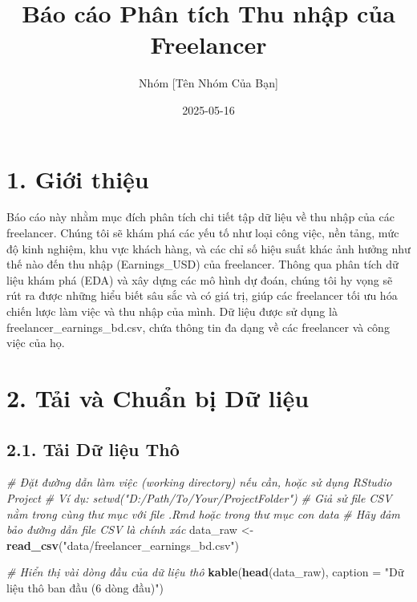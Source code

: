 \documentclass[
]{article}
\title{Báo cáo Phân tích Thu nhập của Freelancer}
\author{Nhóm {[}Tên Nhóm Của Bạn{]}}
\date{2025-05-16}
\newenvironment{Shaded}{\begin{snugshade}}{\end{snugshade}}
\newcommand{\AttributeTok}[1]{\textcolor[rgb]{0.13,0.29,0.53}{#1}}
\newcommand{\CommentTok}[1]{\textcolor[rgb]{0.56,0.35,0.01}{\textit{#1}}}
\newcommand{\FunctionTok}[1]{\textcolor[rgb]{0.13,0.29,0.53}{\textbf{#1}}}
\newcommand{\NormalTok}[1]{#1}
\newcommand{\OtherTok}[1]{\textcolor[rgb]{0.56,0.35,0.01}{#1}}
\newcommand{\StringTok}[1]{\textcolor[rgb]{0.31,0.60,0.02}{#1}}
\begin{document}
\maketitle

{
\setcounter{tocdepth}{2}
\tableofcontents
}
\section{1. Giới thiệu}\label{giux1edbi-thiux1ec7u}

Báo cáo này nhằm mục đích phân tích chi tiết tập dữ liệu về thu nhập của
các freelancer. Chúng tôi sẽ khám phá các yếu tố như loại công việc, nền
tảng, mức độ kinh nghiệm, khu vực khách hàng, và các chỉ số hiệu suất
khác ảnh hưởng như thế nào đến thu nhập (Earnings\_USD) của freelancer.
Thông qua phân tích dữ liệu khám phá (EDA) và xây dựng các mô hình dự
đoán, chúng tôi hy vọng sẽ rút ra được những hiểu biết sâu sắc và có giá
trị, giúp các freelancer tối ưu hóa chiến lược làm việc và thu nhập của
mình. Dữ liệu được sử dụng là freelancer\_earnings\_bd.csv, chứa thông
tin đa dạng về các freelancer và công việc của họ.

\section{2. Tải và Chuẩn bị Dữ
liệu}\label{tux1ea3i-vuxe0-chuux1ea9n-bux1ecb-dux1eef-liux1ec7u}

\subsection{2.1. Tải Dữ liệu
Thô}\label{tux1ea3i-dux1eef-liux1ec7u-thuxf4}

\begin{Shaded}
\begin{Highlighting}[]
\CommentTok{\# Đặt đường dẫn làm việc (working directory) nếu cần, hoặc sử dụng RStudio Project}
\CommentTok{\# Ví dụ: setwd("D:/Path/To/Your/ProjectFolder") }
\CommentTok{\# Giả sử file CSV nằm trong cùng thư mục với file .Rmd hoặc trong thư mục con \textquotesingle{}data\textquotesingle{}}
\CommentTok{\# Hãy đảm bảo đường dẫn file CSV là chính xác}
\NormalTok{data\_raw }\OtherTok{\textless{}{-}} \FunctionTok{read\_csv}\NormalTok{(}\StringTok{"data/freelancer\_earnings\_bd.csv"}\NormalTok{) }

\CommentTok{\# Hiển thị vài dòng đầu của dữ liệu thô}
\FunctionTok{kable}\NormalTok{(}\FunctionTok{head}\NormalTok{(data\_raw), }\AttributeTok{caption =} \StringTok{"Dữ liệu thô ban đầu (6 dòng đầu)"}\NormalTok{)}
\end{Highlighting}
\end{Shaded}
\end{document}
